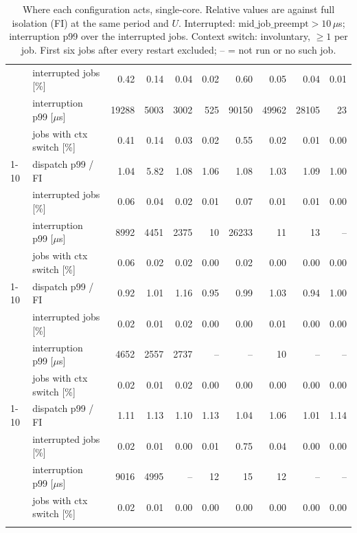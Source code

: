 \begin{longtable}{ll|rrrr|rrrr}
 & interrupted jobs [\%] & 0.42 & 0.14 & 0.04 & 0.02 & 0.60 & 0.05 & 0.04 & 0.01 \\
 & interruption p99 [$\mu$s] & 19288 & 5003 & 3002 & 525 & 90150 & 49962 & 28105 & 23 \\
 & jobs with ctx switch [\%] & 0.41 & 0.14 & 0.03 & 0.02 & 0.55 & 0.02 & 0.01 & 0.00 \\
\cmidrule{1-10}
\multirow[t]{4}{*}{IRQ steering reverted} & dispatch p99 / FI & 1.04 & 5.82 & 1.08 & 1.06 & 1.08 & 1.03 & 1.09 & 1.00 \\
 & interrupted jobs [\%] & 0.06 & 0.04 & 0.02 & 0.01 & 0.07 & 0.01 & 0.01 & 0.00 \\
 & interruption p99 [$\mu$s] & 8992 & 4451 & 2375 & 10 & 26233 & 11 & 13 & -- \\
 & jobs with ctx switch [\%] & 0.06 & 0.02 & 0.02 & 0.00 & 0.02 & 0.00 & 0.00 & 0.00 \\
\cmidrule{1-10}
\multirow[t]{4}{*}{frequency pinning reverted} & dispatch p99 / FI & 0.92 & 1.01 & 1.16 & 0.95 & 0.99 & 1.03 & 0.94 & 1.00 \\
 & interrupted jobs [\%] & 0.02 & 0.01 & 0.02 & 0.00 & 0.00 & 0.01 & 0.00 & 0.00 \\
 & interruption p99 [$\mu$s] & 4652 & 2557 & 2737 & -- & -- & 10 & -- & -- \\
 & jobs with ctx switch [\%] & 0.02 & 0.01 & 0.02 & 0.00 & 0.00 & 0.00 & 0.00 & 0.00 \\
\cmidrule{1-10}
\multirow[t]{4}{*}{boot-params bundle reverted} & dispatch p99 / FI & 1.11 & 1.13 & 1.10 & 1.13 & 1.04 & 1.06 & 1.01 & 1.14 \\
 & interrupted jobs [\%] & 0.02 & 0.01 & 0.00 & 0.01 & 0.75 & 0.04 & 0.00 & 0.00 \\
 & interruption p99 [$\mu$s] & 9016 & 4995 & -- & 12 & 15 & 12 & -- & -- \\
 & jobs with ctx switch [\%] & 0.02 & 0.01 & 0.00 & 0.00 & 0.00 & 0.00 & 0.00 & 0.00 \\
\bottomrule
\caption{Where each configuration acts, single-core. Relative values are against full isolation (FI) at the same period and $U$. Interrupted: $\mathrm{mid\_job\_preempt}>10\,\mu$s; interruption p99 over the interrupted jobs. Context switch: involuntary, $\ge 1$ per job. First six jobs after every restart excluded; -- = not run or no such job.}
\label{tab:rq1-acts-single-core}
\end{longtable}
